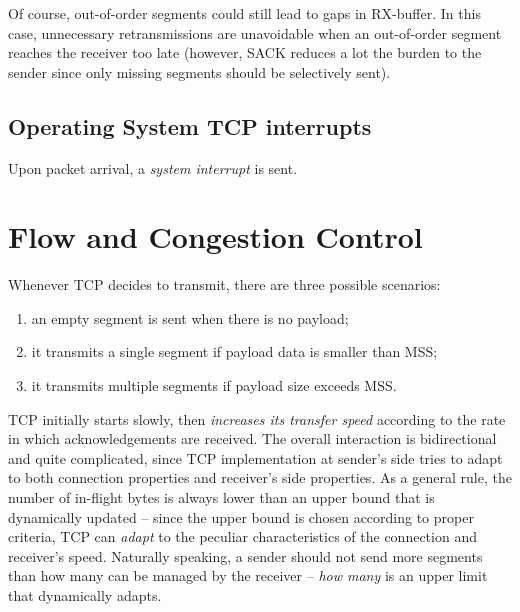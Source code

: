 \documentclass[10pt]{book}
\begin{document}
Of course, out-of-order segments could still lead to gaps in RX-buffer. In this
case, unnecessary retransmissions are unavoidable when an out-of-order segment
reaches the receiver too late (however, SACK reduces a lot the burden to the
sender since only missing segments should be selectively sent).

\section{Operating System TCP interrupts}

Upon packet arrival, a \emph{system interrupt} is sent. 

\chapter{Flow and Congestion Control}

Whenever TCP decides to transmit, there are three possible scenarios: 
\begin{enumerate}
	\item an empty segment is sent when there is no payload;
	\item it transmits a single segment if payload data is smaller than MSS;
	\item it transmits multiple segments if payload size exceeds MSS.
\end{enumerate}

TCP initially starts slowly, then \emph{increases its transfer speed} according
to the rate in which acknowledgements are received. The overall interaction is
bidirectional and quite complicated, since TCP implementation at sender's side
tries to adapt to both connection properties and receiver's side properties.
As a general rule, the number of in-flight bytes is always lower than an upper
bound that is dynamically updated \--- since the upper bound is chosen
according to proper criteria, TCP can \emph{adapt} to the peculiar
characteristics of the connection and receiver's speed. Naturally speaking, a
sender should not send more segments than how many can be managed by the
receiver \--- \emph{how many} is an upper limit that dynamically adapts.
\end{document}
